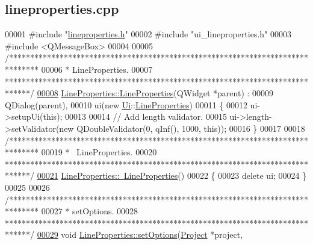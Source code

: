 \hypertarget{lineproperties_8cpp_source}{}\subsection{lineproperties.\+cpp}
\label{lineproperties_8cpp_source}

\begin{DoxyCode}
00001 \textcolor{preprocessor}{#include "\hyperlink{lineproperties_8h}{lineproperties.h}"}
00002 \textcolor{preprocessor}{#include "ui\_lineproperties.h"}
00003 \textcolor{preprocessor}{#include <QMessageBox>}
00004 
00005 \textcolor{comment}{/*******************************************************************************}
00006 \textcolor{comment}{ * LineProperties.}
00007 \textcolor{comment}{ ******************************************************************************/}
\hypertarget{lineproperties_8cpp_source_l00008}{}\hyperlink{class_line_properties_a0bc0d7c02db0a4ea920d040f76679fec}{00008} \hyperlink{class_line_properties_a0bc0d7c02db0a4ea920d040f76679fec}{LineProperties::LineProperties}(QWidget *parent) :
00009   QDialog(parent),
00010   ui(new \hyperlink{namespace_ui}{Ui}::\hyperlink{class_line_properties}{LineProperties})
00011 \{
00012   ui->setupUi(\textcolor{keyword}{this});
00013 
00014   \textcolor{comment}{// Add length validator.}
00015   ui->length->setValidator(\textcolor{keyword}{new} QDoubleValidator(0, qInf(), 1000, \textcolor{keyword}{this}));
00016 \}
00017 
00018 \textcolor{comment}{/*******************************************************************************}
00019 \textcolor{comment}{ * ~LineProperties.}
00020 \textcolor{comment}{ ******************************************************************************/}
\hypertarget{lineproperties_8cpp_source_l00021}{}\hyperlink{class_line_properties_a59017a6580f2e02dc492522d9267de29}{00021} \hyperlink{class_line_properties_a59017a6580f2e02dc492522d9267de29}{LineProperties::~LineProperties}()
00022 \{
00023   \textcolor{keyword}{delete} ui;
00024 \}
00025 
00026 \textcolor{comment}{/*******************************************************************************}
00027 \textcolor{comment}{ * setOptions.}
00028 \textcolor{comment}{ ******************************************************************************/}
\hypertarget{lineproperties_8cpp_source_l00029}{}\hyperlink{class_line_properties_ad434fc8e65787648a44737fb9f46b475}{00029} \textcolor{keywordtype}{void} \hyperlink{class_line_properties_ad434fc8e65787648a44737fb9f46b475}{LineProperties::setOptions}(\hyperlink{class_project}{Project} *project, 

\end{DoxyCode}
